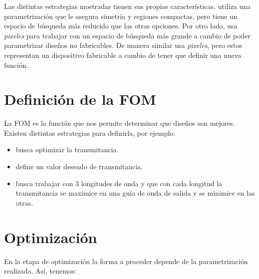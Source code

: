   Las distintas estrategias mostradas tienen sus propias características. 
  \cite{Prosopio-Galarza2019} utiliza una parametrización que le asegura simetría y regiones compactas, pero tiene un espacio de búsqueda más reducido que las otras opciones.
  Por otro lado, \cite{Su2020} usa \emph{pixeles} para trabajar con un espacio de búsqueda más grande a cambio de poder parametrizar diseños no fabricables.
  De manera similar \cite{Piggott2017} usa \emph{pixeles}, pero estos representan un dispositivo fabricable a cambio de tener que definir una nueva función.


\section{Definición de la FOM}

La FOM es la función que nos permite determinar que diseños son mejores. Existen distintas estrategias para definirla, por ejemplo:

\begin{itemize}

  \item \cite{Prosopio-Galarza2019} busca optimizar la transmitancia.

  \item \cite{Su2020} define un valor deseado de transmitancia.

  \item \cite{Piggott2017} busca trabajar con 3 longitudes de onda y que con cada longitud la transmitancia se maximice en una guía de onda de salida y se minimice en las otras.

\end{itemize}


\section{Optimización}

En la etapa de optimización la forma a proceder depende de la parametrización realizada. Así, tenemos:

